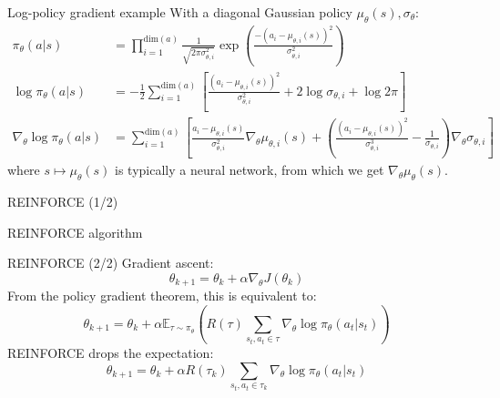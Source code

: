 \documentclass[10pt, aspectratio=1610]{beamer}
\begin{document}
\begin{frame}{Log-policy gradient example}
    With a diagonal Gaussian policy $\mu_\theta(s), \sigma_\theta$:
    \begin{align*}
        \pi_\theta(a|s) & = \prod_{i=1}^{\mathrm{dim}(a)} \frac{1}{\sqrt{2 \pi \sigma_{\theta,i}^2}} \exp\left(\frac{-(a_i - \mu_{\theta,i}(s))^2}{\sigma_{\theta,i}^2}\right) \\
        \log \pi_\theta(a|s) & = -\frac{1}{2} \sum_{i=1}^{\mathrm{dim}(a)} \left[\frac{(a_i - \mu_{\theta,i}(s))^2}{\sigma_{\theta,i}^2} + 2 \log \sigma_{\theta,i} + \log 2\pi \right] \\
        \nabla_\theta \log \pi_\theta(a|s) & = \sum_{i=1}^{\mathrm{dim}(a)} \left[\frac{a_i - \mu_{\theta,i}(s)}{\sigma_{\theta,i}^2} \nabla_\theta \mu_{\theta,i}(s) +  \left(\frac{(a_i - \mu_{\theta,i}(s))^2}{\sigma_{\theta,i}^3} - \frac{1}{\sigma_{\theta,i}}\right) \nabla_\theta \sigma_{\theta,i}\right]
    \end{align*}
    where $s \mapsto \mu_\theta(s)$ is typically a neural network, from which we get $\nabla_\theta \mu_\theta(s)$.
\end{frame}

\begin{frame}{REINFORCE (1/2)}
    \begin{block}{REINFORCE algorithm~\cite{sutton2018}}
        \centering
    \end{block}
\end{frame}

\begin{frame}{REINFORCE (2/2)}
    Gradient ascent:
    $$
    \theta_{k+1} = \theta_k + \alpha \nabla_\theta J(\theta_k)
    $$
    From the policy gradient theorem, this is equivalent to:
    $$
    \theta_{k+1} = \theta_k + \alpha \mathbb{E}_{\tau \sim \pi_\theta} \left(
            R(\tau)
            \sum_{s_t, a_t \in \tau} \nabla_\theta \log \pi_\theta(a_t | s_t)
            \right)
    $$
    REINFORCE drops the expectation:
    $$
    \theta_{k+1} = \theta_k + \alpha R(\tau_k) \sum_{s_t, a_t \in \tau_k} \nabla_\theta \log \pi_\theta(a_t | s_t)
    $$
\end{frame}
\end{document}
